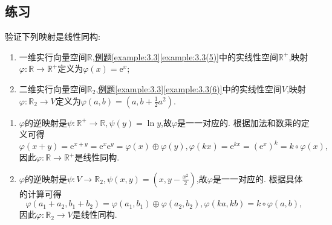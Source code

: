 \documentclass[../../main.tex]{subfiles}
\begin{document}
\subsection{练习}

\begin{exercise}
验证下列映射是线性同构:
\begin{enumerate}[(1)]
\item 一维实行向量空间\(\mathbb{R}\),\hyperref[example:3.3(5)]{例题}\ref{example:3.3}\ref{example:3.3(5)}中的实线性空间\(\mathbb{R}^+\),映射\(\varphi:\mathbb{R}\to\mathbb{R}^+\)定义为\(\varphi(x)=\mathrm{e}^x\);
\item 二维实行向量空间\(\mathbb{R}_2\),\hyperref[example:3.3(6)]{例题}\ref{example:3.3}\ref{example:3.3(6)}中的实线性空间\(V\),映射\(\varphi:\mathbb{R}_2\to V\)定义为\(\varphi(a,b)=(a,b+\frac{1}{2}a^2)\).
\end{enumerate}
\end{exercise}
\begin{solution}
\begin{enumerate}[(1)]
\item  \(\varphi\)的逆映射是\(\psi:\mathbb{R}^+\to\mathbb{R},\psi(y)=\ln y\),故\(\varphi\)是一一对应的. 根据加法和数乘的定义可得
\[
\varphi(x + y)=\mathrm{e}^{x + y}=\mathrm{e}^x\mathrm{e}^y=\varphi(x)\oplus\varphi(y),\varphi(kx)=\mathrm{e}^{kx}=(\mathrm{e}^x)^k=k\circ\varphi(x),
\]
因此\(\varphi:\mathbb{R}\to\mathbb{R}^+\)是线性同构.
\item \(\varphi\)的逆映射是\(\psi:V\to\mathbb{R}_2,\psi(x,y)=(x,y-\frac{x^2}{2})\),故\(\varphi\)是一一对应的. 根据具体的计算可得
\[
\varphi(a_1 + a_2,b_1 + b_2)=\varphi(a_1,b_1)\oplus\varphi(a_2,b_2),\varphi(ka,kb)=k\circ\varphi(a,b),
\]
因此\(\varphi:\mathbb{R}_2\to V\)是线性同构.
\end{enumerate}
\end{solution}
\end{document}
